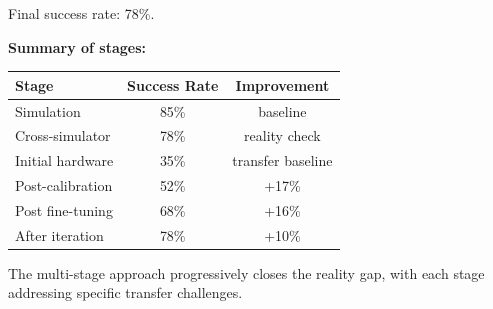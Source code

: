 \begin{example}
Final success rate: 78\%.

\textbf{Summary of stages:}

\begin{center}
\begin{tabular}{lcc}
\toprule
\textbf{Stage} & \textbf{Success Rate} & \textbf{Improvement} \\
\midrule
Simulation & 85\% & baseline \\
Cross-simulator & 78\% & reality check \\
Initial hardware & 35\% & transfer baseline \\
Post-calibration & 52\% & +17\% \\
Post fine-tuning & 68\% & +16\% \\
After iteration & 78\% & +10\% \\
\bottomrule
\end{tabular}
\end{center}

The multi-stage approach progressively closes the reality gap, with each stage addressing specific transfer challenges.
\end{example}

